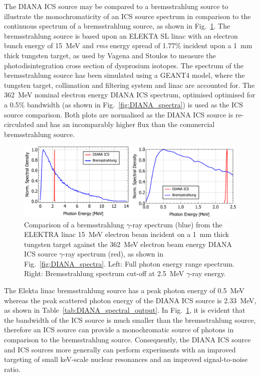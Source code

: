 \documentclass[../main.tex]{subfiles}
\begin{document}
The DIANA ICS source may be compared to a bremsstrahlung source to illustrate the monochromaticity of an ICS source spectrum in comparison to the continuous spectrum of a bremsstrahlung source, as shown in Fig.~\ref{fig:ICS_Brem_comparison}. The bremsstrahlung source is based upon an ELEKTA SL linac \cite{hansen1998quality} with an electron bunch energy of 15~\si{\mega\electronvolt} and \textit{rms} energy spread of 1.77\% incident upon a 1~\si{\milli\meter} thick tungsten target, as used by Vagena and Stoulos \cite{vagena2017photodisintegration} to measure the photodisintegration cross section of dysprosium isotopes. The spectrum of the bremsstrahlung source has been simulated using a \textsc{GEANT4} \cite{agostinelli2003geant4} model, where the tungsten target, collimation and filtering system and linac are accounted for. The 362~\si{\mega\electronvolt} nominal electron energy DIANA ICS spectrum, optimised optimised for a 0.5\%  bandwidth (as shown in Fig.~\ref{fig:DIANA_spectra}) is used as the ICS source comparison. Both plots are normalised as the DIANA ICS source is re-circulated and has an incomparably higher flux than the commercial bremsstrahlung source.
\begin{figure}[!h]
\centering
\includegraphics[width=\textwidth]{Figures/DIANA_Inverse_Compton_Source_Design/ICS_Brem_Comparison.pdf}
\caption{Comparison of a bremsstrahlung $\gamma$-ray spectrum (blue) from the ELEKTRA linac 15~\si{\mega\electronvolt} electron beam incident on a 1~\si{\milli\meter} thick tungsten target against the 362~\si{\mega\electronvolt} electron beam energy DIANA ICS source $\gamma$-ray spectrum (red), as shown in Fig.~\ref{fig:DIANA_spectra}. Left: Full photon energy range spectrum. Right: Bremsstrahlung spectrum cut-off at 2.5~\si{\mega\electronvolt} $\gamma$-ray energy.}
\label{fig:ICS_Brem_comparison}
\end{figure}

The Elekta linac bremsstrahlung source has a peak photon energy of 0.5~\si{\mega\electronvolt} whereas the peak scattered photon energy of the DIANA ICS source is 2.33~\si{\mega\electronvolt}, as shown in Table~\ref{tab:DIANA_spectral_output}. In Fig.~\ref{fig:ICS_Brem_comparison}, it is evident that the bandwidth of the ICS source is much smaller than the bremsstrahlung source, therefore an ICS source can provide a monochromatic source of photons in comparison to the bremsstrahlung source. Consequently, the DIANA ICS source and ICS sources more generally can perform experiments with an improved targeting of small \si{\kilo\electronvolt}-scale nuclear resonances and an improved signal-to-noise ratio.
\end{document}
